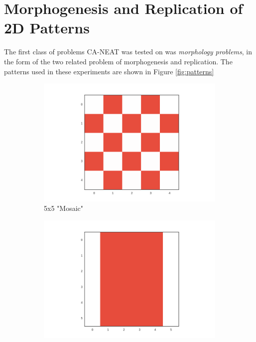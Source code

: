 \section{Morphogenesis and Replication of 2D Patterns}
\label{sec:prev_work}
The first class of problems CA-NEAT was tested on was \textit{morphology problems}, in the form of the two related problem of morphogenesis and replication.
The patterns used in these experiments are shown in Figure \ref{fig:patterns}

\begin{figure}
\centering
\begin{subfigure}[b]{.20\textwidth}
\centering
\includegraphics[width=\textwidth]{fig/mosaic}
\caption{5x5 "Mosaic"}
\label{fig:mosaic_pattern}
\end{subfigure}%
\begin{subfigure}[b]{.20\textwidth}
\centering
\includegraphics[width=\textwidth]{fig/border}

\end{subfigure}
\end{figure}

